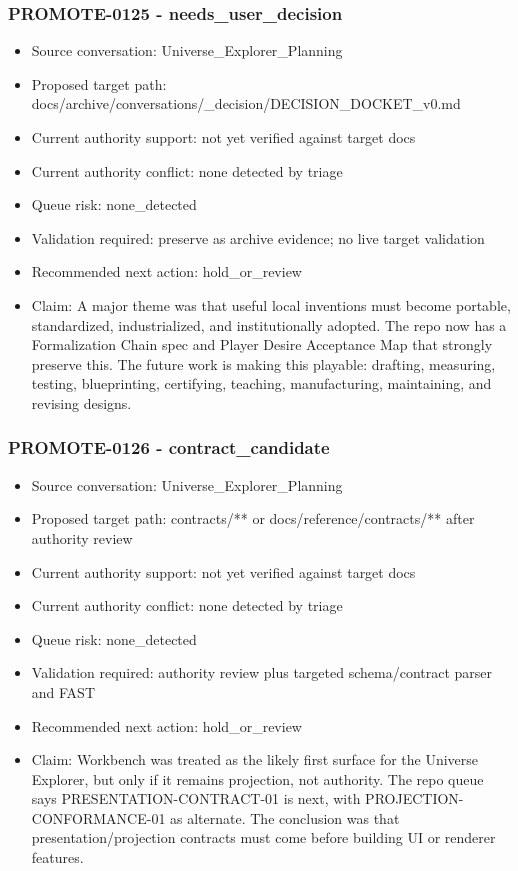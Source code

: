 \documentclass[11pt,a4paper]{report}
\begin{document}
\subsubsection{PROMOTE-0125 - needs\_user\_decision}

\begin{itemize}
\item Source conversation: Universe\_Explorer\_Planning
\item Proposed target path: docs/archive/conversations/\_decision/DECISION\_DOCKET\_v0.md
\item Current authority support: not yet verified against target docs
\item Current authority conflict: none detected by triage
\item Queue risk: none\_detected
\item Validation required: preserve as archive evidence; no live target validation
\item Recommended next action: hold\_or\_review
\item Claim: A major theme was that useful local inventions must become portable, standardized, industrialized, and institutionally adopted. The repo now has a Formalization Chain spec and Player Desire Acceptance Map that strongly preserve this. The future work is making this playable: drafting, measuring, testing, blueprinting, certifying, teaching, manufacturing, maintaining, and revising designs.
\end{itemize}

\subsubsection{PROMOTE-0126 - contract\_candidate}

\begin{itemize}
\item Source conversation: Universe\_Explorer\_Planning
\item Proposed target path: contracts/** or docs/reference/contracts/** after authority review
\item Current authority support: not yet verified against target docs
\item Current authority conflict: none detected by triage
\item Queue risk: none\_detected
\item Validation required: authority review plus targeted schema/contract parser and FAST
\item Recommended next action: hold\_or\_review
\item Claim: Workbench was treated as the likely first surface for the Universe Explorer, but only if it remains projection, not authority. The repo queue says PRESENTATION-CONTRACT-01 is next, with PROJECTION-CONFORMANCE-01 as alternate. The conclusion was that presentation/projection contracts must come before building UI or renderer features.
\end{itemize}
\end{document}
